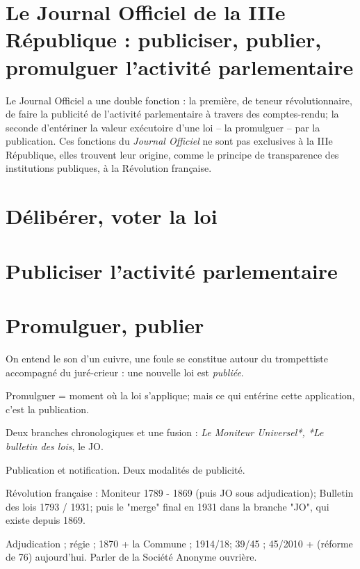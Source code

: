 \noindent{}

\section{Le Journal Officiel de la IIIe République : publiciser, publier, promulguer l'activité parlementaire}

Le {Journal Officiel} a une double fonction : la première, de teneur révolutionnaire, de faire la publicité de l'activité parlementaire à travers des comptes-rendu; la seconde d'entériner la valeur exécutoire d'une loi -- la promulguer -- par la publication. Ces fonctions du \textit{Journal Officiel} ne sont pas exclusives à la IIIe République, elles trouvent leur origine, comme le principe de transparence des institutions publiques, à la Révolution française.

\section{Délibérer, voter la loi}

\section{Publiciser l'activité parlementaire}

\section{Promulguer, publier}

On entend le son d'un cuivre, une foule se constitue autour du trompettiste accompagné du juré-crieur : une nouvelle loi est \textit{publiée}.

Promulguer = moment où la loi s'applique; mais ce qui entérine cette application, c'est la publication.


Deux branches chronologiques et une fusion : \textit{Le Moniteur Universel*, *Le bulletin des lois}, le JO.

Publication et notification. Deux modalités de publicité.

Révolution française : Moniteur 1789 - 1869 (puis JO sous adjudication); Bulletin des lois 1793 / 1931; puis le "merge" final en 1931 dans la branche "JO", qui existe depuis 1869.

Adjudication ; régie ; 1870 + la Commune ; 1914/18; 39/45 ; 45/2010 + (réforme de 76) aujourd'hui. Parler de la Société Anonyme ouvrière.

